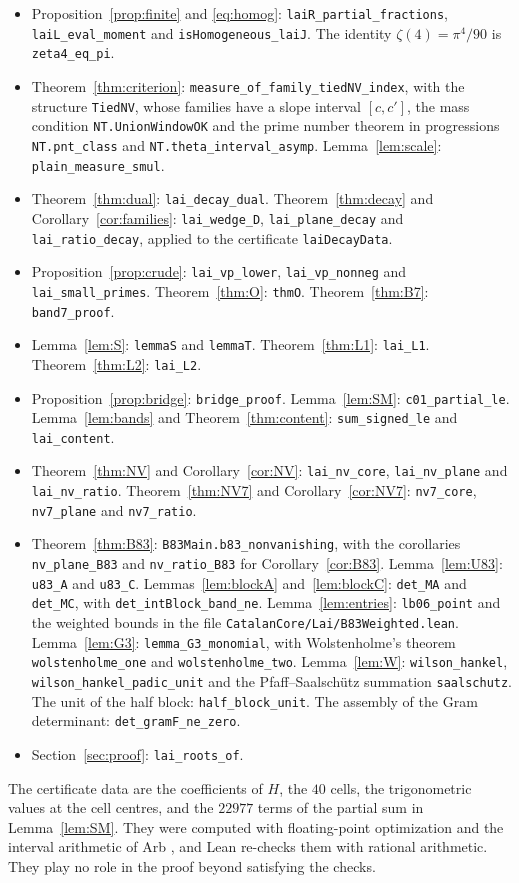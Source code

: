 \documentclass[11pt]{amsart}
\theoremstyle{definition}
\theoremstyle{remark}
\numberwithin{equation}{section}
\newcommand{\lean}[1]{\nolinkurl{#1}}
\begin{document}
\begin{itemize}
\item Proposition~\ref{prop:finite} and \eqref{eq:homog}: \lean{laiR_partial_fractions}, \lean{laiL_eval_moment} and
 \lean{isHomogeneous_laiJ}. The identity $\zeta(4)=\pi^4/90$ is \lean{zeta4_eq_pi}.
\item Theorem~\ref{thm:criterion}: \lean{measure_of_family_tiedNV_index}, with the structure \lean{TiedNV}, whose families have a slope interval $[c,c']$, the mass
 condition \lean{NT.UnionWindowOK} and the prime number theorem in progressions \lean{NT.pnt_class} and
 \lean{NT.theta_interval_asymp}. Lemma~\ref{lem:scale}: \lean{plain_measure_smul}.
\item Theorem~\ref{thm:dual}: \lean{lai_decay_dual}. Theorem~\ref{thm:decay} and Corollary~\ref{cor:families}:
 \lean{lai_wedge_D}, \lean{lai_plane_decay} and \lean{lai_ratio_decay}, applied to the certificate \lean{laiDecayData}.
\item Proposition~\ref{prop:crude}: \lean{lai_vp_lower}, \lean{lai_vp_nonneg} and \lean{lai_small_primes}.
 Theorem~\ref{thm:O}: \lean{thmO}. Theorem~\ref{thm:B7}: \lean{band7_proof}.
\item Lemma~\ref{lem:S}: \lean{lemmaS} and \lean{lemmaT}. Theorem~\ref{thm:L1}: \lean{lai_L1}.
 Theorem~\ref{thm:L2}: \lean{lai_L2}.
\item Proposition~\ref{prop:bridge}: \lean{bridge_proof}. Lemma~\ref{lem:SM}: \lean{c01_partial_le}.
 Lemma~\ref{lem:bands} and Theorem~\ref{thm:content}: \lean{sum_signed_le} and \lean{lai_content}.
\item Theorem~\ref{thm:NV} and Corollary~\ref{cor:NV}: \lean{lai_nv_core}, \lean{lai_nv_plane} and \lean{lai_nv_ratio}.
 Theorem~\ref{thm:NV7} and Corollary~\ref{cor:NV7}: \lean{nv7_core}, \lean{nv7_plane} and \lean{nv7_ratio}.
\item Theorem~\ref{thm:B83}: \lean{B83Main.b83_nonvanishing}, with the corollaries \lean{nv_plane_B83} and \lean{nv_ratio_B83} for Corollary~\ref{cor:B83}.
 Lemma~\ref{lem:U83}: \lean{u83_A} and \lean{u83_C}. Lemmas~\ref{lem:blockA} and~\ref{lem:blockC}: \lean{det_MA} and \lean{det_MC}, with \lean{det_intBlock_band_ne}.
 Lemma~\ref{lem:entries}: \lean{lb06_point} and the weighted bounds in the file \lean{CatalanCore/Lai/B83Weighted.lean}. Lemma~\ref{lem:G3}: \lean{lemma_G3_monomial}, with Wolstenholme's theorem
 \lean{wolstenholme_one} and \lean{wolstenholme_two}. Lemma~\ref{lem:W}: \lean{wilson_hankel}, \lean{wilson_hankel_padic_unit} and the
 Pfaff--Saalschütz summation \lean{saalschutz}. The unit of the half block: \lean{half_block_unit}. The assembly of the Gram determinant: \lean{det_gramF_ne_zero}.
\item Section~\ref{sec:proof}: \lean{lai_roots_of}.
\end{itemize}
The certificate data are the coefficients of $H$, the $40$ cells, the trigonometric values at the cell centres, and
the $22977$ terms of the partial sum in Lemma~\ref{lem:SM}. They were computed with floating-point optimization and
the interval arithmetic of Arb \cite{Arb}, and Lean re-checks them with rational arithmetic. They play no role in the
proof beyond satisfying the checks.
\end{document}
